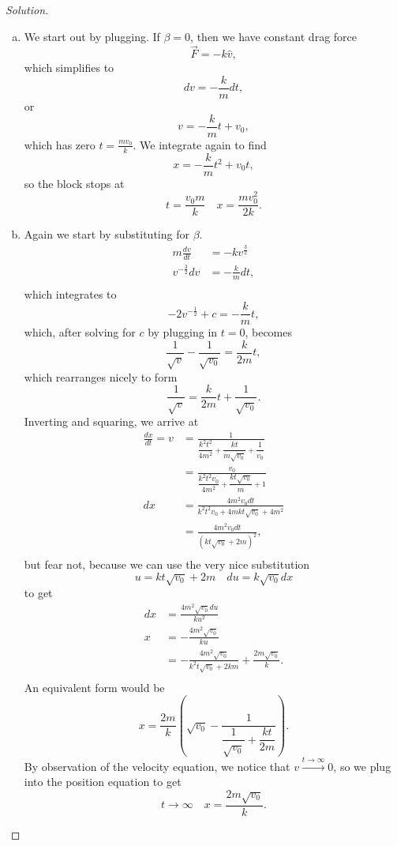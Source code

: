 \documentclass{article}
\begin{document}
\begin{proof}[Solution]
$ $
\begin{enumerate}[(a)]
\item
We start out by plugging. If $\beta = 0$, then we have constant drag
force
\[ \vec{F} = -k\hat{v}, \]
which simplifies to
\[ dv = -\frac{k}{m} dt, \]
or
\[ v = -\frac{k}{m} t + v_0, \]
which has zero $t = \frac{mv_0}{k}$.  We integrate again to find
\[ x = -\frac{k}{m}t^2 + v_0 t, \]
so the block stops at
\[ \boxed{t = \frac{v_0 m}{k} \quad x = \frac{mv_0^2}{2k}}. \]
\item
Again we start by substituting for $\beta$.
\[ \begin{aligned}
m \frac{dv}{dt} &= -k v^{\frac{3}{2}} \\
v^{-\frac{3}{2}} dv &= -\frac{k}{m} dt, \\
\end{aligned} \]
which integrates to
\[ -2v^{-\frac{1}{2}} + c = -\frac{k}{m}t, \]
which, after solving for $c$ by plugging in $t = 0$, becomes
\[ \frac{1}{\sqrt{v}} - \frac{1}{\sqrt{v_0}} = \frac{k}{2m} t, \]
which rearranges nicely to form
\[ \frac{1}{\sqrt{v}} = \frac{k}{2m} t + \frac{1}{\sqrt{v_0}}. \]
Inverting and squaring, we arrive at
\[ \begin{aligned}
\frac{dx}{dt} = v &= \frac{1}{\dfrac{k^2 t^2}{4m^2} +
\dfrac{kt}{m\sqrt{v_0}} + \dfrac{1}{v_0}} \\
&= \frac{v_0}{\dfrac{k^2t^2v_0}{4m^2} + \dfrac{kt\sqrt{v_0}}{m} + 1} \\
dx &= \frac{4m^2 v_0 dt}{k^2 t^2 v_0 + 4mkt \sqrt{v_0} + 4m^2} \\
&= \frac{4m^2 v_0 dt}{\left(kt \sqrt{v_0} + 2m\right)^2}, \\
\end{aligned} \]
but fear not, because we can use the very nice substitution
\[ u = kt\sqrt{v_0} + 2m \quad du = k \sqrt{v_0} dx \]
to get
\[ \begin{aligned}
dx &= \frac{4m^2 \sqrt{v_0} du}{k u^2} \\
x &= -\frac{4m^2 \sqrt{v_0}}{ku} \\
&= -\frac{4m^2\sqrt{v_0}}{k^2 t\sqrt{v_0} + 2km} +
\frac{2m\sqrt{v_0}}{k}. \\
\end{aligned} \]
An equivalent form would be
\[ x = \frac{2m}{k} \left(\sqrt{v_0} - \frac{1}{\dfrac{1}{\sqrt{v_0}} +
\dfrac{kt}{2m}} \right). \]
By observation of the velocity equation, we notice that $v
\xrightarrow{t \to \infty} 0$, so we plug into the position equation to
get
\[ \boxed{t \to \infty \quad x = \frac{2m\sqrt{v_0}}{k}}. \]

\end{enumerate}
\end{proof}
\end{document}
